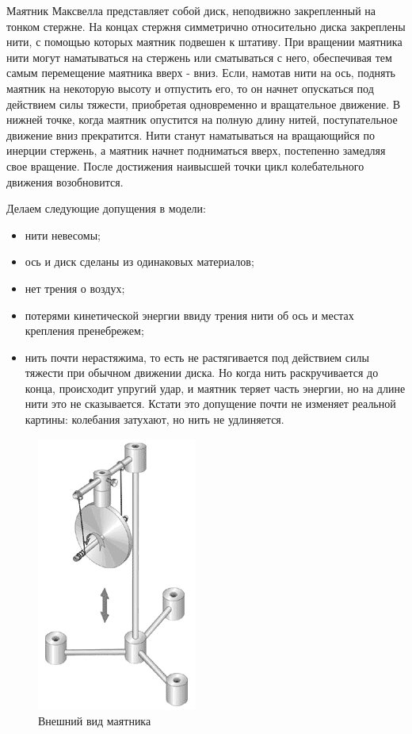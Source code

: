 Маятник Максвелла представляет собой диск, неподвижно закрепленный на тонком стержне. На концах стержня симметрично относительно диска закреплены нити, с помощью которых маятник подвешен к штативу. При вращении маятника нити могут наматываться на стержень или сматываться с него, обеспечивая тем самым перемещение маятника вверх - вниз. Если, намотав нити на ось, поднять маятник на некоторую высоту и отпустить его, то он начнет опускаться под действием силы тяжести, приобретая одновременно и вращательное движение. В нижней точке, когда маятник опустится на полную длину нитей, поступательное движение вниз прекратится. Нити станут наматываться на вращающийся по инерции стержень, а маятник начнет подниматься вверх, постепенно замедляя свое вращение. После достижения наивысшей точки цикл колебательного движения возобновится.

Делаем следующие допущения в модели: 
\begin{itemize}
\item нити невесомы; 
\item ось и диск сделаны из одинаковых материалов; 
\item нет трения о воздух; 
\item потерями кинетической энергии ввиду трения нити об ось и местах крепления пренебрежем; 
\item нить почти нерастяжима, то есть не растягивается под действием силы тяжести при обычном движении диска. Но когда нить раскручивается до конца, происходит упругий удар, и маятник теряет часть энергии, но на длине нити это не сказывается. Кстати это допущение почти не изменяет реальной картины: колебания затухают, но нить не удлиняется.
\end{itemize}

 \begin{figure} [h] 
   \center
   \includegraphics {HML_PendulumOfMaxwell2.png}
   \caption{Внешний вид маятника} 
   \label{img:HML_PendulumOfMaxwell2}  
 \end{figure}
 
